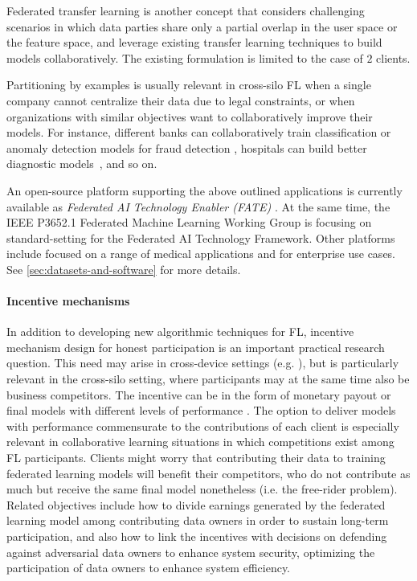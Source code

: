 \documentclass[11pt]{article}
\begin{document}
Federated transfer learning \citep{DBLP:journals/corr/abs-1902-04885} is another concept that considers challenging scenarios in which data parties share only a partial overlap in the user space or the feature space, and leverage existing transfer learning techniques \cite{Pan:2010:STL:1850483.1850545} to build models collaboratively. The existing formulation is limited to the case of $2$ clients.

Partitioning by examples is usually relevant in cross-silo FL when a single company cannot centralize their data due to legal constraints, or when organizations with similar objectives want to collaboratively improve their models. For instance, different banks can collaboratively train classification or anomaly detection models for fraud detection \citep{webankswissre19reinsurance}, hospitals can build better diagnostic models~\citep{courtiol2019deep}, and so on.

An open-source platform supporting the above outlined applications is currently available as \textit{Federated AI Technology Enabler (FATE)} \citep{FATE}. At the same time, the IEEE P3652.1 Federated Machine Learning Working Group is focusing on standard-setting for the Federated AI Technology Framework. Other platforms include \cite{ClaraTraining} focused on a range of medical applications and \cite{IBMFL} for enterprise use cases. See \cref{sec:datasets-and-software} for more details.

\paragraph{Incentive mechanisms} In addition to developing new algorithmic techniques for FL, incentive mechanism design for honest participation is an important practical research question. This need may arise in cross-device settings (e.g. \citep{kang19incentive,kang2019incentiveB}), but is particularly relevant in the cross-silo setting, where participants may at the same time also be business competitors. The incentive can be in the form of monetary payout \citep{Yu-et-al:2020IS} or final models with different levels of performance \citep{Lyu-et-al:2020TPDS}. The option to deliver models with performance commensurate to the contributions of each client is especially relevant in collaborative learning situations in which competitions exist among FL participants. Clients might worry that contributing their data to training federated learning models will benefit their competitors, who do not contribute as much but receive the same final model nonetheless (i.e. the free-rider problem). Related objectives include how to divide earnings generated by the federated learning model among contributing data owners in order to sustain long-term participation, and also how to link the incentives with decisions on defending against adversarial data owners to enhance system security, optimizing the participation of data owners to enhance system efficiency.
\end{document}
